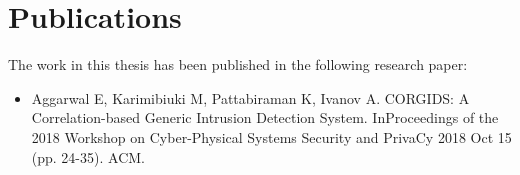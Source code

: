 \section {Publications}
The work in this thesis has been published in the following research paper:
\begin{itemize}
\item Aggarwal E, Karimibiuki M, Pattabiraman K, Ivanov A. CORGIDS: A Correlation-based Generic Intrusion Detection System. InProceedings of the 2018 Workshop on Cyber-Physical Systems Security and PrivaCy 2018 Oct 15 (pp. 24-35). ACM.
\end{itemize}

\endinput
